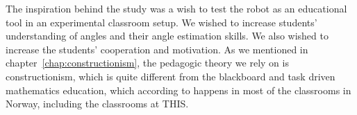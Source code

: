 The inspiration behind the study was a wish to test the robot as an educational tool in an experimental classroom setup. We wished to increase students' understanding of angles and their angle estimation skills. We also wished to increase the students' cooperation and motivation. As we mentioned in chapter~\ref{chap:constructionism}, the pedagogic theory we rely on is constructionism, which is quite different from the blackboard and task driven mathematics education, which according to  happens in most of the classrooms in Norway, including the classrooms at THIS. %





